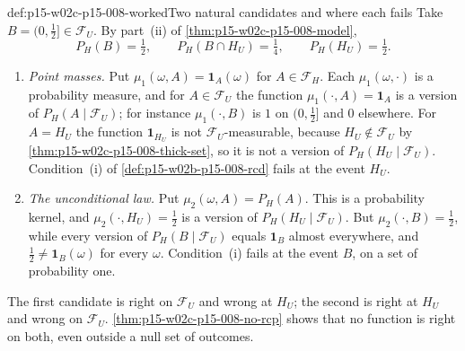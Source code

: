 \begin{hbexample}{def:p15-w02c-p15-008-worked}{Two natural candidates and where each fails}
Take \(B=(0,\tfrac12]\in\mathcal F_U\). By part~(ii) of
\cref{thm:p15-w02c-p15-008-model},
\[
 P_H(B)=\tfrac12,\qquad P_H(B\cap H_U)=\tfrac14,\qquad
 P_H(H_U)=\tfrac12 .
\]
\begin{enumerate}
\item \emph{Point masses.} Put \(\mu_1(\omega,A)=\mathbf1_A(\omega)\) for
      \(A\in\mathcal F_H\). Each \(\mu_1(\omega,\cdot)\) is a probability
      measure, and for \(A\in\mathcal F_U\) the function
      \(\mu_1(\cdot,A)=\mathbf1_A\) is a version of
      \(P_H(A\mid\mathcal F_U)\); for instance \(\mu_1(\cdot,B)\) is
      \(1\) on \((0,\tfrac12]\) and \(0\) elsewhere. For \(A=H_U\) the
      function \(\mathbf1_{H_U}\) is not \(\mathcal F_U\)-measurable,
      because \(H_U\notin\mathcal F_U\) by
      \cref{thm:p15-w02c-p15-008-thick-set}, so it is not a version of
      \(P_H(H_U\mid\mathcal F_U)\). Condition~(i) of
      \cref{def:p15-w02b-p15-008-rcd} fails at the event \(H_U\).
\item \emph{The unconditional law.} Put \(\mu_2(\omega,A)=P_H(A)\). This is
      a probability kernel, and \(\mu_2(\cdot,H_U)=\tfrac12\) is a version
      of \(P_H(H_U\mid\mathcal F_U)\). But \(\mu_2(\cdot,B)=\tfrac12\),
      while every version of \(P_H(B\mid\mathcal F_U)\) equals
      \(\mathbf1_B\) almost everywhere, and \(\tfrac12\neq\mathbf1_B(\omega)\)
      for every \(\omega\). Condition~(i) fails at the event \(B\), on a set
      of probability one.
\end{enumerate}
The first candidate is right on \(\mathcal F_U\) and wrong at \(H_U\); the
second is right at \(H_U\) and wrong on \(\mathcal F_U\).
\cref{thm:p15-w02c-p15-008-no-rcp} shows that no function is right on
both, even outside a null set of outcomes.
\end{hbexample}

